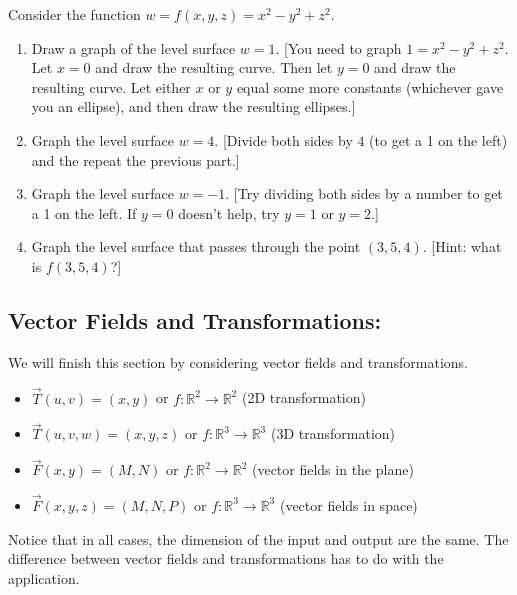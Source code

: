 \begin{challenge}
%
Consider the function $w=f(x,y,z)=x^2-y^2+z^2$.
 \begin{enumerate}
  \item Draw a graph of the level surface $w=1$. [You need to graph $1=x^2-y^2+z^2$. Let $x=0$ and draw the resulting curve. Then let $y=0$ and draw the resulting curve. Let either $x$ or $y$ equal some more constants (whichever gave you an ellipse), and then draw the resulting ellipses.]  
  \item Graph the level surface $w=4$. [Divide both sides by $4$ (to get a 1 on the left) and the repeat the previous part.]
  \item Graph the level surface $w=-1$. [Try dividing both sides by a number to get a 1 on the left. If $y=0$ doesn't help, try $y=1$ or $y=2$.]
  \item Graph the level surface that passes through the point $(3,5,4)$. [Hint: what is $f(3,5,4)$?]
 \end{enumerate}
\end{challenge}


\subsection{Vector Fields and Transformations:} %

We will finish this section by considering vector fields and transformations. 
\begin{itemize}
 \item $\vec T(u,v)=(x,y)$ or $f\colon \mathbb{R}^2\to\mathbb{R}^2$ (2D transformation)
 \item $\vec T(u,v,w)=(x,y,z)$ or $f\colon \mathbb{R}^3\to\mathbb{R}^3$ (3D transformation)
 \item $\vec F(x,y)=(M,N)$ or $f\colon \mathbb{R}^2\to\mathbb{R}^2$ (vector fields in the plane)
 \item $\vec F(x,y,z)=(M,N,P)$ or $f\colon \mathbb{R}^3\to\mathbb{R}^3$ (vector fields in space)
 \end{itemize}
Notice that in all cases, the dimension of the input and output are the same. The difference between vector fields and transformations has to do with the application.

